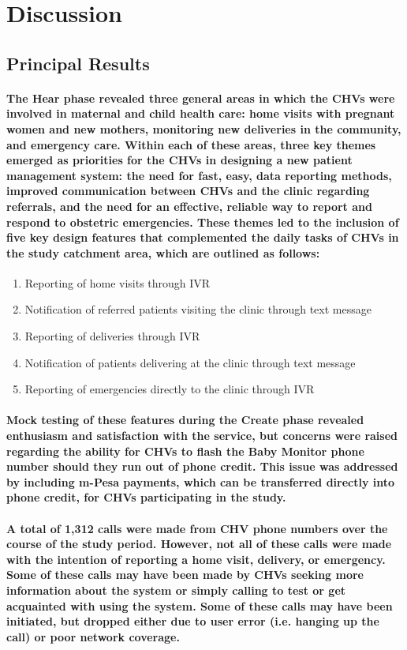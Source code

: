 \section{Discussion}

\subsection{Principal Results}
\paragraph{The Hear phase revealed three general areas in which the CHVs were involved in maternal and child health care: home visits with pregnant women and new mothers, monitoring new deliveries in the community, and emergency care. Within each of these areas, three key themes emerged as priorities for the CHVs in designing a new patient management system: the need for fast, easy, data reporting methods, improved communication between CHVs and the clinic regarding referrals, and the need for an effective, reliable way to report and respond to obstetric emergencies. These themes led to the inclusion of five key design features that complemented the daily tasks of CHVs in the study catchment area, which are outlined as follows:}
\begin{enumerate}
	\item Reporting of home visits through IVR
	\item Notification of referred patients visiting the clinic through text message
	\item Reporting of deliveries through IVR
	\item Notification of patients delivering at the clinic through text message
	\item Reporting of emergencies directly to the clinic through IVR
\end{enumerate}

\paragraph{Mock testing of these features during the Create phase revealed enthusiasm and satisfaction with the service, but concerns were raised regarding the ability for CHVs to flash the Baby Monitor phone number should they run out of phone credit. This issue was addressed by including m-Pesa payments, which can be transferred directly into phone credit, for CHVs participating in the study.}

\paragraph{A total of 1,312 calls were made from CHV phone numbers over the course of the study period. However, not all of these calls were made with the intention of reporting a home visit, delivery, or emergency. Some of these calls may have been made by CHVs seeking more information about the system or simply calling to test or get acquainted with using the system. Some of these calls may have been initiated, but dropped either due to user error (i.e. hanging up the call) or poor network coverage.}


